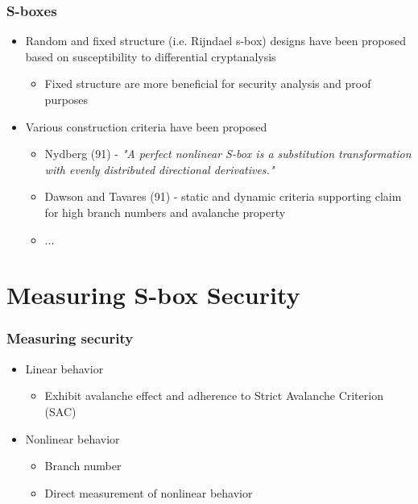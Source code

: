 \documentclass[handout]{beamer}
\begin{document}
\begin{frame}
	\frametitle{S-boxes}
	\begin{itemize}
		\item Random and fixed structure (i.e. Rijndael s-box) designs have been proposed based on susceptibility to differential cryptanalysis
		\begin{itemize}
			\item Fixed structure are more beneficial for security analysis and proof purposes
		\end{itemize}
		\item Various construction criteria have been proposed
		\begin{itemize}
			\item Nydberg (91) - \emph{"A perfect nonlinear S-box is a substitution transformation with evenly distributed directional derivatives."}
			\item Dawson and Tavares (91) - static and dynamic criteria supporting claim for high branch numbers and avalanche property
			\item ...
		\end{itemize}
	\end{itemize}
\end{frame}

\section{Measuring S-box Security}
\begin{frame}
	\frametitle{Measuring security}
	\begin{itemize}
		\item Linear behavior
		\begin{itemize}
			\item Exhibit avalanche effect and adherence to Strict Avalanche Criterion (SAC)
		\end{itemize}
		\item Nonlinear behavior
		\begin{itemize}
			\item Branch number
			\item Direct measurement of nonlinear behavior
		\end{itemize}
	\end{itemize}
\end{frame}
\end{document}
